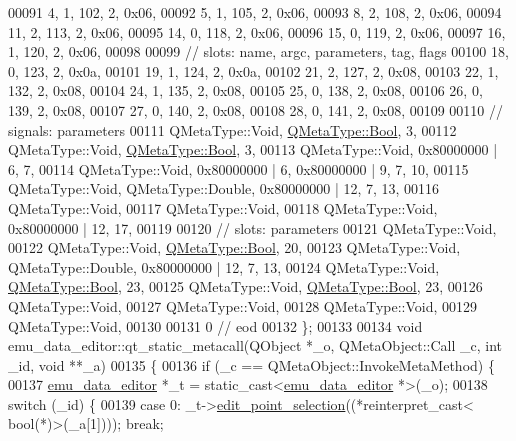 \begin{DoxyCode}
00091        4,    1,  102,    2, 0x06,
00092        5,    1,  105,    2, 0x06,
00093        8,    2,  108,    2, 0x06,
00094       11,    2,  113,    2, 0x06,
00095       14,    0,  118,    2, 0x06,
00096       15,    0,  119,    2, 0x06,
00097       16,    1,  120,    2, 0x06,
00098 
00099  \textcolor{comment}{// slots: name, argc, parameters, tag, flags}
00100       18,    0,  123,    2, 0x0a,
00101       19,    1,  124,    2, 0x0a,
00102       21,    2,  127,    2, 0x08,
00103       22,    1,  132,    2, 0x08,
00104       24,    1,  135,    2, 0x08,
00105       25,    0,  138,    2, 0x08,
00106       26,    0,  139,    2, 0x08,
00107       27,    0,  140,    2, 0x08,
00108       28,    0,  141,    2, 0x08,
00109 
00110  \textcolor{comment}{// signals: parameters}
00111     QMetaType::Void, \hyperlink{a00001_a76a8b016e5ad61faf9062cc387df5016}{QMetaType::Bool},    3,
00112     QMetaType::Void, \hyperlink{a00001_a76a8b016e5ad61faf9062cc387df5016}{QMetaType::Bool},    3,
00113     QMetaType::Void, 0x80000000 | 6,    7,
00114     QMetaType::Void, 0x80000000 | 6, 0x80000000 | 9,    7,   10,
00115     QMetaType::Void, QMetaType::Double, 0x80000000 | 12,    7,   13,
00116     QMetaType::Void,
00117     QMetaType::Void,
00118     QMetaType::Void, 0x80000000 | 12,   17,
00119 
00120  \textcolor{comment}{// slots: parameters}
00121     QMetaType::Void,
00122     QMetaType::Void, \hyperlink{a00001_a76a8b016e5ad61faf9062cc387df5016}{QMetaType::Bool},   20,
00123     QMetaType::Void, QMetaType::Double, 0x80000000 | 12,    7,   13,
00124     QMetaType::Void, \hyperlink{a00001_a76a8b016e5ad61faf9062cc387df5016}{QMetaType::Bool},   23,
00125     QMetaType::Void, \hyperlink{a00001_a76a8b016e5ad61faf9062cc387df5016}{QMetaType::Bool},   23,
00126     QMetaType::Void,
00127     QMetaType::Void,
00128     QMetaType::Void,
00129     QMetaType::Void,
00130 
00131        0        \textcolor{comment}{// eod}
00132 \};
00133 
00134 \textcolor{keywordtype}{void} emu\_data\_editor::qt\_static\_metacall(QObject *\_o, QMetaObject::Call \_c, \textcolor{keywordtype}{int} \_id, \textcolor{keywordtype}{void} **\_a)
00135 \{
00136     \textcolor{keywordflow}{if} (\_c == QMetaObject::InvokeMetaMethod) \{
00137         \hyperlink{a00004}{emu\_data\_editor} *\_t = \textcolor{keyword}{static\_cast<}\hyperlink{a00004}{emu\_data\_editor} *\textcolor{keyword}{>}(\_o);
00138         \textcolor{keywordflow}{switch} (\_id) \{
00139         \textcolor{keywordflow}{case} 0: \_t->\hyperlink{a00004_a9aa2af0c329358fd96f7fb6b7f02bfe1}{edit\_point\_selection}((*\textcolor{keyword}{reinterpret\_cast<} \textcolor{keywordtype}{bool}(*)\textcolor{keyword}{>}(\_a[1]))); \textcolor{keywordflow}{break};

\end{DoxyCode}
